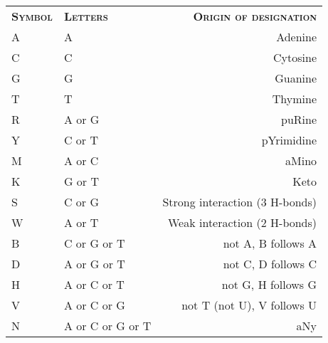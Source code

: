 \documentclass{article}
\begin{document}
\begin{center}

\noindent\begin{minipage}{\linewidth}%
\begin{center}%
\begin{tabular}{>{\scshape}llr}%
\rowcolor[gray]{0.9}
\color{black} \bfseries \scshape Symbol & \bfseries \scshape Letters & \bfseries \scshape Origin of designation\\
A & A & Adenine\\
C & C & Cytosine\\
G & G & Guanine\\
T & T & Thymine\\
\hline
R & A or G & puRine\\
Y & C or T & pYrimidine\\
M & A or C & aMino\\
K & G or T & Keto\\
\hline
S & C or G & Strong interaction (3 H-bonds)\\
W & A or T & Weak interaction (2 H-bonds)\\
B & C or G or T & not A, B follows A\\
D & A or G or T & not C, D follows C\\
H & A or C or T & not G, H follows G\\
V & A or C or G & not T (not U), V follows U\\
\hline
N & A or C or G or T & aNy\\
\end{tabular}%
\end{center}%
\end{minipage}%

\end{center}%
\end{document}
